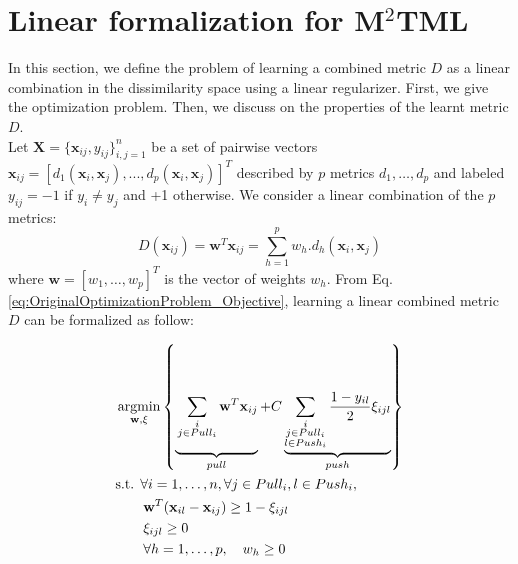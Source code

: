\section{Linear formalization for M$^2$TML}

In this section, we define the problem of learning a combined metric $D$ as a linear combination in the dissimilarity space using a linear regularizer. First, we give the optimization problem. Then, we discuss on the properties of the learnt metric $D$. \\
\noindent Let $\textbf{X} = \{\textbf{x}_{ij},y_{ij}\}_{i,j=1}^n$ be a set of pairwise vectors $\textbf{x}_{ij}=[d_1(\textbf{x}_i,\textbf{x}_j), ..., d_p(\textbf{x}_i,\textbf{x}_j)]^T$  described by $p$ metrics $d_1, \ldots, d_p$ and labeled $y_{ij} = -1$ if $y_i \neq y_j$ and +1 otherwise. We consider a linear combination of the $p$ metrics:
\begin{equation}
D(\textbf{x}_{ij})=\textbf{w}^T\textbf{x}_{ij} = \sum_{h=1}^p w_h.d_h(\textbf{x}_i,\textbf{x}_j)
\label{eq:D_linear}
\end{equation}
where $\textbf{w}=[w_1, \ldots, w_p]^T$ is the vector of weights $w_h$. From Eq. \ref{eq:OriginalOptimizationProblem_Objective}, learning a linear combined metric $D$ can be formalized as follow:

\begin{equation}
\begin{aligned}
		&\displaystyle 		\argmin_{\textbf{w},\xi}
		\left\lbrace \underbrace{
		\vphantom{ \sum\limits_{\substack{i \\ j \in Pull_i \\ l \in Push_i}} \frac{1-y_{il}}{2} \xi_{ijl} }
			\sum\limits_{\substack{i \\ j \in Pull_i}} \textbf{w}^T\textbf{x}_{ij}
		}_{pull}					
		+	
		C \underbrace{				
			\sum\limits_{\substack{i \\ j \in Pull_i \\ l \in Push_i}} \frac{1-y_{il}}{2} \xi_{ijl}
		}_{push} \right\rbrace \\
 		&\text{s.t.  } \forall i = 1, \ldots, n, \forall j \in Pull_i, l \in Push_i, \\
		& \qquad \textbf{w}^T(\textbf{x}_{il}-\textbf{x}_{ij}) \geq 1-\xi_{ijl}  \\
		& \qquad \xi_{ijl} \geq 0 \\
		& \qquad \forall h=1, \ldots, p, \quad w_h \geq 0
		\label{eq:MMLPrimal} 
\end{aligned}
\end{equation}

